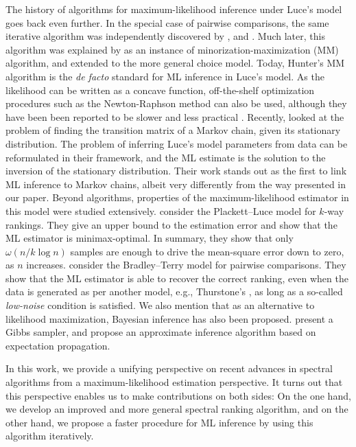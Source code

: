 The history of algorithms for maximum-likelihood inference under Luce's model goes back even further.
In the special case of pairwise comparisons, the same iterative algorithm was independently discovered by \citet{zermelo1928berechnung}, \citet{ford1957solution} and \citet{dykstra1960rank}.
Much later, this algorithm was explained by \citet{hunter2004mm} as an instance of minorization-maximization (MM) algorithm, and extended to the more general choice model.
Today, Hunter's MM algorithm is the \emph{de facto} standard for ML inference in Luce's model.
As the likelihood can be written as a concave function, off-the-shelf optimization procedures such as the Newton-Raphson method can also be used, although they have been been reported to be slower and less practical \citep{hunter2004mm}.
Recently, \citet{kumar2015inverting} looked at the problem of finding the transition matrix of a Markov chain, given its stationary distribution.
The problem of inferring Luce's model parameters from data can be reformulated in their framework, and the ML estimate is the solution to the inversion of the stationary distribution.
Their work stands out as the first to link ML inference to Markov chains, albeit very differently from the way presented in our paper.
Beyond algorithms, properties of the maximum-likelihood estimator in this model were studied extensively.
\citet{hajek2014minimax} consider the Plackett--Luce model for $k$-way rankings.
They give an upper bound to the estimation error and show that the ML estimator is minimax-optimal.
In summary, they show that only $\omega(n/k \log n)$ samples are enough to drive the mean-square error down to zero, as $n$ increases.
\citet{rajkumar2014statistical} consider the Bradley--Terry model for pairwise comparisons.
They show that the ML estimator is able to recover the correct ranking, even when the data is generated as per another model, e.g., Thurstone's \citep{thurstone1927method}, as long as a so-called \emph{low-noise} condition is satisfied.
We also mention that as an alternative to likelihood maximization, Bayesian inference has also been proposed.
\citet{caron2012efficient} present a Gibbs sampler, and \citet{guiver2009bayesian} propose an approximate inference algorithm based on expectation propagation.

In this work, we provide a unifying perspective on recent advances in spectral algorithms \citep{negahban2012iterative, azari2013generalized} from a maximum-likelihood estimation perspective.
It turns out that this perspective enables us to make contributions on both sides:
On the one hand, we develop an improved and more general spectral ranking algorithm, and on the other hand, we propose a faster procedure for ML inference by using this algorithm iteratively.
